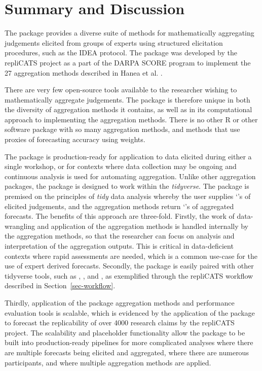 \documentclass[article]{jss}
\newcommand{\class}[1]{`\code{#1}'}
\begin{document}
\section{Summary and Discussion}\label{sec-summary}

The  package provides a diverse suite of methods for
mathematically aggregating judgements elicited from groups of experts
using structured elicitation procedures, such as the IDEA protocol. The
 package was developed by the repliCATS project as a part
of the DARPA SCORE program to implement the 27 aggregation methods
described in Hanea et al. \citeyearpar{Hanea2021}.

There are very few open-source tools available to the researcher wishing
to mathematically aggregate judgements. The  package is
therefore unique in both the diversity of aggregation methods it
contains, as well as in its computational approach to implementing the
aggregation methods. There is no other R or other software package with
so many aggregation methods, and methods that use proxies of forecasting
accuracy using weights.

The  package is production-ready for application to data
elicited during either a single workshop, or for contexts where data
collection may be ongoing and continuous analysis is used for automating
aggregation. Unlike other aggregation packages, the 
package is designed to work within the \emph{tidyverse}. The package is
premised on the principles of \emph{tidy} data analysis whereby the user
supplies \class{data.frame}s of elicited judgements, and the aggregation
methods return \class{data.frame}s of aggregated forecasts. The benefits
of this approach are three-fold. Firstly, the work of data-wrangling and
application of the aggregation methods is handled internally by the
aggregation methods, so that the researcher can focus on analysis and
interpretation of the aggregation outputs. This is critical in
data-deficient contexts where rapid assessments are needed, which is a
common use-case for the use of expert derived forecasts. Secondly, the
 package is easily paired with other tidyverse tools, such
as , , and , as exemplified through
the repliCATS workflow described in Section~\ref{sec-workflow}.

Thirdly, application of the  package aggregation methods
and performance evaluation tools is scalable, which is evidenced by the
application of the  package to forecast the replicability
of over 4000 research claims by the repliCATS project. The scalability
and placeholder functionality allow the  package to be
built into production-ready pipelines for more complicated analyses
where there are multiple forecasts being elicited and aggregated, where
there are numerous participants, and where multiple aggregation methods
are applied.
\end{document}
